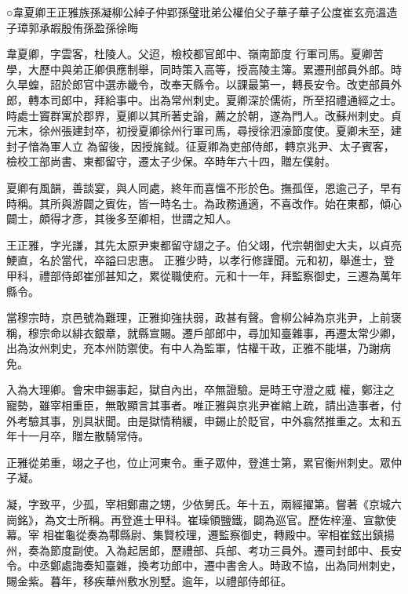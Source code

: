 
\begin{pinyinscope}

 ○韋夏卿王正雅族孫凝柳公綽子仲郢孫璧玭弟公權伯父子華子華子公度崔玄亮溫造子璋郭承嘏殷侑孫盈孫徐晦



 韋夏卿，字雲客，杜陵人。父迢，檢校都官郎中、嶺南節度
 行軍司馬。夏卿苦學，大歷中與弟正卿俱應制舉，同時策入高等，授高陵主簿。累遷刑部員外郎。時久旱蝗，詔於郎官中選赤畿令，改奉天縣令。以課最第一，轉長安令。改吏部員外郎，轉本司郎中，拜給事中。出為常州刺史。夏卿深於儒術，所至招禮通經之士。時處士竇群寓於郡界，夏卿以其所著史論，薦之於朝，遂為門人。改蘇州刺史。貞元末，徐州張建封卒，初授夏卿徐州行軍司馬，尋授徐泗濠節度使。夏卿未至，建封子愔為軍人立
 為留後，因授旄鉞。征夏卿為吏部侍郎，轉京兆尹、太子賓客，檢校工部尚書、東都留守，遷太子少保。卒時年六十四，贈左僕射。



 夏卿有風韻，善談宴，與人同處，終年而喜慍不形於色。撫孤侄，恩逾己子，早有時稱。其所與游闢之賓佐，皆一時名士。為政務通適，不喜改作。始在東都，傾心闢士，頗得才彥，其後多至卿相，世謂之知人。



 王正雅，字光謙，其先太原尹東都留守翃之子。伯父翊，代宗朝御史大夫，以貞亮鯁直，名於當代，卒謚曰忠惠。
 正雅少時，以孝行修謹聞。元和初，舉進士，登甲科，禮部侍郎崔邠甚知之，累從職使府。元和十一年，拜監察御史，三遷為萬年縣令。



 當穆宗時，京邑號為難理，正雅抑強扶弱，政甚有聲。會柳公綽為京兆尹，上前褒稱，穆宗命以緋衣銀章，就縣宣賜。遷戶部郎中，尋加知臺雜事，再遷太常少卿，出為汝州刺史，充本州防禦使。有中人為監軍，怙權干政，正雅不能堪，乃謝病免。



 入為大理卿。會宋申錫事起，獄自內出，卒無證驗。是時王守澄之威
 權，鄭注之寵勢，雖宰相重臣，無敢顯言其事者。唯正雅與京兆尹崔綰上疏，請出造事者，付外考驗其事，別具狀聞。由是獄情稍緩，申錫止於貶官，中外翕然推重之。太和五年十一月卒，贈左散騎常侍。



 正雅從弟重，翊之子也，位止河東令。重子眾仲，登進士第，累官衡州刺史。眾仲子凝。



 凝，字致平，少孤，宰相鄭肅之甥，少依舅氏。年十五，兩經擢第。嘗著《京城六崗銘》，為文士所稱。再登進士甲科。崔璪領鹽鐵，闢為巡官。歷佐梓潼、宣歙使幕。宰
 相崔龜從奏為鄠縣尉、集賢校理，遷監察御史，轉殿中。宰相崔鉉出鎮揚州，奏為節度副使。入為起居郎，歷禮部、兵部、考功三員外。遷司封郎中、長安令。中丞鄭處誨奏知臺雜，換考功郎中，遷中書舍人。時政不協，出為同州刺史，賜金紫。暮年，移疾華州敷水別墅。逾年，以禮部侍郎征。




\end{pinyinscope}
